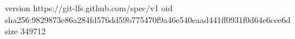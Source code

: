 version https://git-lfs.github.com/spec/v1
oid sha256:9829873e86a284fd576dd59b775470f9a46e540eaad441ff0931f0d64e6cee6d
size 349712
